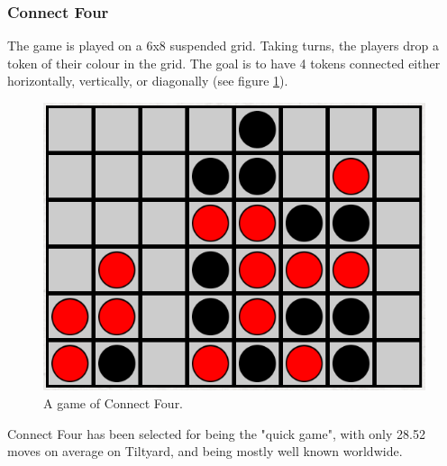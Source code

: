 \subsubsection*{Connect Four}
The game is played on a 6x8 suspended grid. Taking turns, the players drop a token of their colour in the grid. The goal is to have 4 tokens connected either horizontally, vertically, or diagonally (see figure \ref{fig:connect4}).
\begin{figure}[H]
\centering
	\includegraphics[scale=0.35]{figure/connectfour}
    \caption{A game of Connect Four.}
    \label{fig:connect4}
\end{figure}
Connect Four has been selected for being the "quick game", with only 28.52 moves on average on Tiltyard\cite{connect4}, and being mostly well known worldwide.
